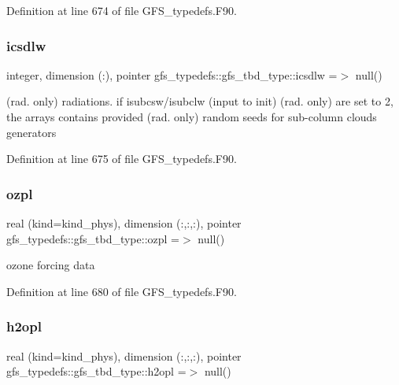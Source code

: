 Definition at line 674 of file G\+F\+S\+\_\+typedefs.\+F90.

\mbox{\label{structgfs__typedefs_1_1gfs__tbd__type_afbd55c6c4cb322d6801152ec6e6f786d}} 
\subsubsection{icsdlw}
{\footnotesize\ttfamily integer, dimension   (\+:), pointer gfs\+\_\+typedefs\+::gfs\+\_\+tbd\+\_\+type\+::icsdlw =$>$ null()}



(rad. only) radiations. if isubcsw/isubclw (input to init) (rad. only) are set to 2, the arrays contains provided (rad. only) random seeds for sub-\/column clouds generators 



Definition at line 675 of file G\+F\+S\+\_\+typedefs.\+F90.

\mbox{\label{structgfs__typedefs_1_1gfs__tbd__type_aaa7a1df304f468447c0ad09fd59bf891}} 
\subsubsection{ozpl}
{\footnotesize\ttfamily real (kind=kind\+\_\+phys), dimension     (\+:,\+:,\+:), pointer gfs\+\_\+typedefs\+::gfs\+\_\+tbd\+\_\+type\+::ozpl =$>$ null()}



ozone forcing data 



Definition at line 680 of file G\+F\+S\+\_\+typedefs.\+F90.

\mbox{\label{structgfs__typedefs_1_1gfs__tbd__type_aeb69e8042e5ed53ab875fee44034626b}} 
\subsubsection{h2opl}
{\footnotesize\ttfamily real (kind=kind\+\_\+phys), dimension    (\+:,\+:,\+:), pointer gfs\+\_\+typedefs\+::gfs\+\_\+tbd\+\_\+type\+::h2opl =$>$ null()}



